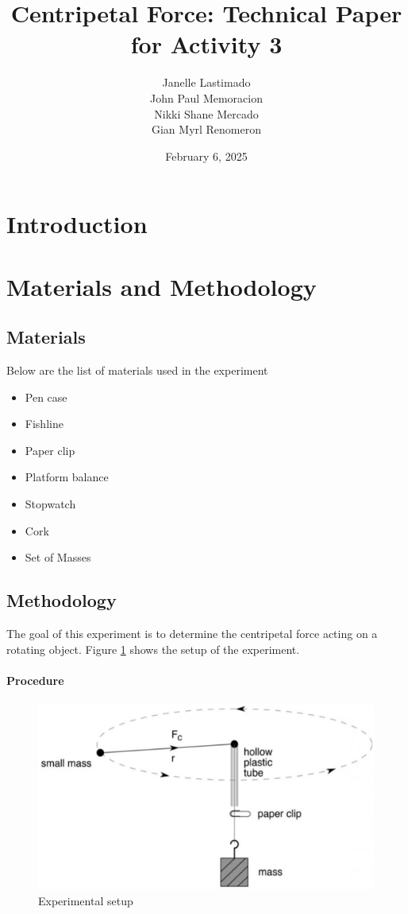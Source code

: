 \documentclass[a4paper,12pt]{article}
\title{Centripetal Force: Technical Paper for Activity 3}
\author{Janelle Lastimado \\
John Paul Memoracion \\ 
Nikki Shane Mercado \\
Gian Myrl Renomeron}
\date{February 6, 2025}
\begin{document}
\maketitle

\begin{abstract}

\end{abstract}

\section{Introduction}

\section{Materials and Methodology}


\subsection{Materials}
Below are the list of materials used in the experiment
\begin{itemize}
    \item Pen case
    \item Fishline
    \item Paper clip
    \item Platform balance
    \item Stopwatch
    \item Cork
    \item Set of Masses
\end{itemize}

\subsection{Methodology}
The goal of this experiment is to determine the centripetal force acting on a rotating object. Figure \ref{fig:setup} shows the setup of the experiment.


\paragraph{Procedure}

\begin{figure}[]
    \centering
    \includegraphics[width=1\textwidth]{experiment_setup.png}
    \caption{Experimental setup}
    \label{fig:setup}
\end{figure}
\end{document}
